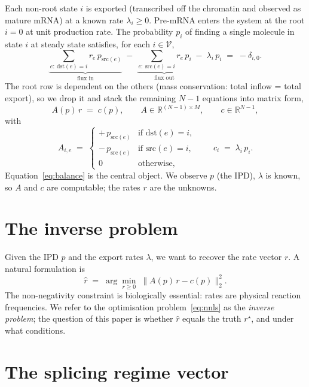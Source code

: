 \documentclass[11pt, a4paper]{article}
\newcommand{\R}{\mathbb{R}}
\newcommand{\rstar}{r^{\star}}
\begin{document}
Each non-root state $i$ is exported (transcribed off the chromatin and observed as mature mRNA) at a known rate $\lambda_i \geq 0$. Pre-mRNA enters the system at the root $i = 0$ at unit production rate. The probability $p_i$ of finding a single molecule in state $i$ at steady state satisfies, for each $i \in \mathcal{V}$,
\begin{equation}
\underbrace{\sum_{e:\ \mathrm{dst}(e) = i} r_e\, p_{\mathrm{src}(e)}}_{\text{flux in}}
\;-\;
\underbrace{\sum_{e:\ \mathrm{src}(e) = i} r_e\, p_i}_{\text{flux out}}
\;-\;
\lambda_i\, p_i
\;=\;
-\delta_{i, 0}.
\label{eq:balance-row}
\end{equation}
The root row is dependent on the others (mass conservation: total inflow = total export), so we drop it and stack the remaining $N - 1$ equations into matrix form,
\begin{equation}
A(p)\, r \;=\; c(p), \qquad A \in \R^{(N - 1) \times M}, \qquad c \in \R^{N - 1},
\label{eq:balance}
\end{equation}
with
\[
A_{i, e} \;=\; \begin{cases} +\,p_{\mathrm{src}(e)} & \text{if } \mathrm{dst}(e) = i, \\ -\,p_{\mathrm{src}(e)} & \text{if } \mathrm{src}(e) = i, \\ 0 & \text{otherwise}, \end{cases}
\qquad
c_i \;=\; \lambda_i\, p_i.
\]
Equation~\eqref{eq:balance} is the central object. We observe $p$ (the IPD), $\lambda$ is known, so $A$ and $c$ are computable; the rates $r$ are the unknowns.

\section{The inverse problem}
\label{sec:inverse}

Given the IPD $p$ and the export rates $\lambda$, we want to recover the rate vector $r$. A natural formulation is
\begin{equation}
\widehat{r} \;=\; \arg\min_{r \geq 0} \; \big\| A(p)\, r - c(p) \big\|_2^2.
\label{eq:nnls}
\end{equation}
The non-negativity constraint is biologically essential: rates are physical reaction frequencies. We refer to the optimisation problem~\eqref{eq:nnls} as the \emph{inverse problem}; the question of this paper is whether $\widehat{r}$ equals the truth $\rstar$, and under what conditions.

\section{The splicing regime vector}
\label{sec:srv}
\end{document}
